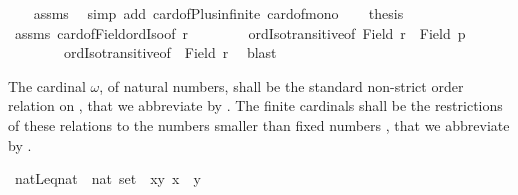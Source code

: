 \begin{isabellebody}
\ \ \isamarkupfalse%
\ assms\ \isamarkupfalse%
\ {\isacharparenleft}{\kern0pt}simp\ add{\isacharcolon}{\kern0pt}\ card{\isacharunderscore}{\kern0pt}of{\isacharunderscore}{\kern0pt}Plus{\isacharunderscore}{\kern0pt}infinite\ card{\isacharunderscore}{\kern0pt}of{\isacharunderscore}{\kern0pt}mono{}{\isacharparenright}{\kern0pt}\isanewline
\ \ \isamarkupfalse%
\ {\isacharquery}{\kern0pt}thesis\isanewline
\ \ \isamarkupfalse%
\ assms\ card{\isacharunderscore}{\kern0pt}of{\isacharunderscore}{\kern0pt}Field{\isacharunderscore}{\kern0pt}ordIso{\isacharbrackleft}{\kern0pt}of\ r{\isacharbrackright}{\kern0pt}\isanewline
\ \ \ \ \ \ \ \ ordIso{\isacharunderscore}{\kern0pt}transitive{\isacharbrackleft}{\kern0pt}of\ {\isachardoublequoteopen}{\isacharbar}{\kern0pt}Field\ r\ {\isacharless}{\kern0pt}{\isacharplus}{\kern0pt}{\isachargreater}{\kern0pt}\ Field\ p{\isacharbar}{\kern0pt}{\isachardoublequoteclose}{\isacharbrackright}{\kern0pt}\isanewline
\ \ \ \ \ \ \ \ ordIso{\isacharunderscore}{\kern0pt}transitive{\isacharbrackleft}{\kern0pt}of\ {\isacharunderscore}{\kern0pt}\ {\isachardoublequoteopen}{\isacharbar}{\kern0pt}Field\ r{\isacharbar}{\kern0pt}{\isachardoublequoteclose}{\isacharbrackright}{\kern0pt}\ \isamarkupfalse%
\ blast\isanewline
{}\isamarkupfalse%
%
\endisatagproof
{\isafoldproof}%
%
\isadelimproof
%
\endisadelimproof
%
\isadelimdocument
%
\endisadelimdocument
%
\isatagdocument
%
\isamarkuptrue%
%
\endisatagdocument
{\isafolddocument}%
%
\isadelimdocument
%
\endisadelimdocument
%
\begin{isamarkuptext}%
The cardinal $\omega$, of natural numbers, shall be the standard non-strict
order relation on
, that we abbreviate by .  The finite cardinals
shall be the restrictions of these relations to the numbers smaller than
fixed numbers , that we abbreviate by .%
\end{isamarkuptext}\isamarkuptrue%
\isamarkupfalse%
\ {\isachardoublequoteopen}{\isacharparenleft}{\kern0pt}natLeq{\isacharcolon}{\kern0pt}{\isacharcolon}{\kern0pt}{\isacharparenleft}{\kern0pt}nat\ {\isacharasterisk}{\kern0pt}\ nat{\isacharparenright}{\kern0pt}\ set{\isacharparenright}{\kern0pt}\ {\isasymequiv}\ {\isacharbraceleft}{\kern0pt}{\isacharparenleft}{\kern0pt}x{\isacharcomma}{\kern0pt}y{\isacharparenright}{\kern0pt}{\isachardot}{\kern0pt}\ x\ {\isasymle}\ y{\isacharbraceright}{\kern0pt}{\isachardoublequoteclose}\isanewline

\end{isabellebody}
